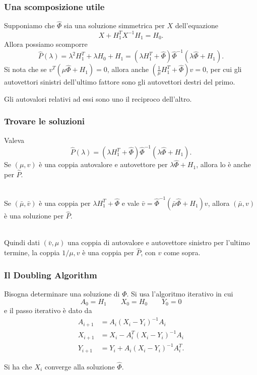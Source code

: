 \documentclass{beamer}
\begin{document}
\begin{frame}
\frametitle{Una scomposizione utile}
    Supponiamo che $\hat{\Phi}$ sia una soluzione simmetrica per $X$
    dell'equazione
    \[
        X + H_1^T X^{-1} H_1 = H_0.
    \]
    Allora possiamo scomporre
    \[
        \hat{P}(\lambda) = \lambda^2 H_1^T + \lambda H_0 + H_1 = 
        (\lambda H_1^T + \hat{\Phi})\hat{\Phi}^{-1}(\lambda \hat{\Phi} + H_1).
    \]
    Si nota che se $v^T(\mu \hat{\Phi} + H_1)=0$, allora anche $\left(
    \frac{1}{\mu}  H_1^T + \hat{\Phi}\right)v=0$,  per cui gli autovettori
    sinistri dell'ultimo fattore sono gli autovettori destri del primo. 

    Gli autovalori relativi ad essi sono uno il reciproco dell'altro.
\end{frame}

\begin{frame}
\frametitle{Trovare le soluzioni}
    Valeva
    \[
        \hat{P}(\lambda) = (\lambda H_1^T + \hat{\Phi})\hat{\Phi}^{-1}(\lambda
        \hat{\Phi} + H_1).
    \]
    Se $(\mu, v)$ \`e una coppia autovalore e autovettore per $\lambda
    \hat{\Phi} + H_1$, allora lo \`e anche per $\hat{P}$. \\~\

    Se $(\bar{\mu}, \bar{v})$ \`e una coppia per $\lambda H_1^T + \hat{\Phi}$ e
    vale $\bar{v} = \hat{\Phi}^{-1}(\bar{\mu} \hat{\Phi} + H_1)v$, allora
    $(\bar{\mu}, v)$ \`e una soluzione per $\hat{P}$. \\~\

    Quindi dati $(\bar{v}, \mu)$ una coppia di autovalore e autovettore sinistro
    per l'ultimo termine, la coppia $1/\mu, v$ \`e una coppia per $\hat{P}$,
    con $v$ come sopra.
\end{frame}

\begin{frame}
\frametitle{Il Doubling Algorithm}
    Bisogna determinare una soluzione di $\Phi$. Si usa l'algoritmo iterativo in
    cui
    \[
        A_0 = H_1 \qquad X_0 = H_0 \qquad Y_0 = 0
    \]
    e il  passo iterativo \`e dato da
    \begin{align*}
        A_{i+1} &= A_i(X_i-Y_i)^{-1}A_i \\
        X_{i+1} &= X_i - A_i^T(X_i-Y_i)^{-1}A_i \\
        Y_{i+1} &= Y_i + A_i(X_i-Y_i)^{-1}A_i^T.
    \end{align*}

    Si ha che $X_i$ converge alla soluzione $\hat{\Phi}$.
\end{frame}
\end{document}
